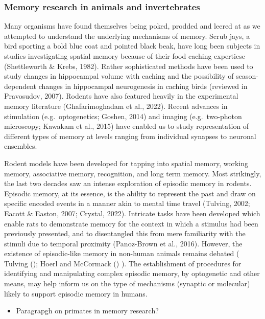 \documentclass[
  letterpaper,
  DIV=11,
  numbers=noendperiod,
  oneside]{scrartcl}
\providecommand{\tightlist}{%
  \setlength{\itemsep}{0pt}\setlength{\parskip}{0pt}}\usepackage{longtable,booktabs,array}
\begin{document}
\subsubsection{Memory research in animals and
invertebrates}\label{memory-research-in-animals-and-invertebrates}

Many organisms have found themselves being poked, prodded and leered at
as we attempted to understand the underlying mechanisms of memory. Scrub
jays, a bird sporting a bold blue coat and pointed black beak, have long
been subjects in studies investigating spatial memory because of their
food caching expertiese (Shettleworth \& Krebs, 1982). Rather
sophisticated methods have been used to study changes in hippocampal
volume with caching and the possibility of season-dependent changes in
hippocampal neurogenesis in caching birds (reviewed in Pravosudov,
2007). Rodents have also featured heavily in the experimental memory
literature (Ghafarimoghadam et al., 2022). Recent advances in
stimulation (e.g.~optogenetics; Goshen, 2014) and imaging
(e.g.~two-photon microscopy; Kawakam et al., 2015) have enabled us to
study representation of different types of memory at levels ranging from
individual synapses to neuronal ensembles.

Rodent models have been developed for tapping into spatial memory,
working memory, associative memory, recognition, and long term memory.
Most strikingly, the last two decades saw an intense exploration of
episodic memory in rodents. Episodic memory, at its essence, is the
ability to represent the past and draw on specific encoded events in a
manner akin to mental time travel (Tulving, 2002; Eacott \& Easton,
2007; Crystal, 2022). Intricate tasks have been developed which enable
rats to demonstrate memory for the context in which a stimulus had been
previously presented, and to disentangled this from mere familiarity
with the stimuli due to temporal proximity (Panoz-Brown et al., 2016).
However, the existence of episodic-like memory in non-human animals
remains debated ( Tulving (); Hoerl and
McCormack () ). The establishment of
procedures for identifying and manipulating complex episodic memory, by
optogenetic and other means, may help inform us on the type of
mechanisms (synaptic or molecular) likely to support episodic memory in
humans.

\begin{itemize}
\tightlist
\item
  Paragrapgh on primates in memory research?
\end{itemize}
\end{document}
